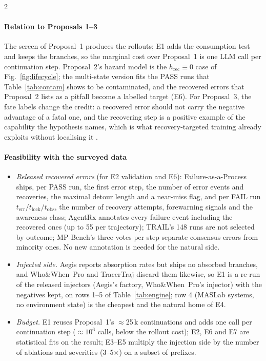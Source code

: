 \begin{multicols}{2}
\paragraph{Relation to Proposals 1--3} The screen of Proposal~1 produces the rollouts; E1 adds the consumption test and keeps the branches, so the marginal cost over Proposal~1 is one LLM call per continuation step. Proposal~2's hazard model is the $h_{\mathrm{rec}}\equiv0$ case of Fig.~\ref{fig:lifecycle}; the multi-state version fits the PASS runs that Table~\ref{tab:contam} shows to be contaminated, and the recovered errors that Proposal~2 lists as a pitfall become a labelled target (E6). For Proposal~3, the fate labels change the credit: a recovered error should not carry the negative advantage of a fatal one, and the recovering step is a positive example of the capability the hypothesis names, which is what recovery-targeted training already exploits without localising it \cite{cuarecovery2026,reterm2026}.

\paragraph{Feasibility with the surveyed data}
\begin{itemize}[leftmargin=1.1em]
\item \emph{Released recovered errors} (for E2 validation and E6): Failure-as-a-Process ships, per PASS run, the first error step, the number of error events and recoveries, the maximal detour length and a near-miss flag, and per FAIL run $t_{\mathrm{err}}/t_{\mathrm{lock}}/t_{\mathrm{obs}}$, the number of recovery attempts, forewarning signals and the awareness class; AgentRx annotates every failure event including the recovered ones (up to 55 per trajectory); TRAIL's 148 runs are not selected by outcome; MP-Bench's three votes per step separate consensus errors from minority ones. No new annotation is needed for the natural side.
\item \emph{Injected side.} Aegis reports absorption rates but ships no absorbed branches, and Who\&When~Pro and TracerTraj discard them likewise, so E1 is a re-run of the released injectors (Aegis's factory, Who\&When~Pro's injector) with the negatives kept, on rows 1--5 of Table~\ref{tab:engine}; row 4 (MASLab systems, no environment state) is the cheapest and the natural home of E4.
\item \emph{Budget.} E1 reuses Proposal~1's $\approx$25\,k continuations and adds one call per continuation step ($\approx10^6$ calls, below the rollout cost); E2, E6 and E7 are statistical fits on the result; E3--E5 multiply the injection side by the number of ablations and severities (3--5$\times$) on a subset of prefixes.
\end{itemize}


\end{multicols}
